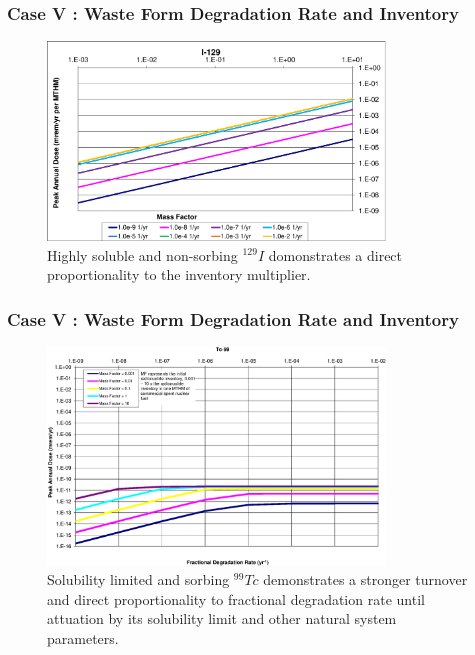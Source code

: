 \begin{frame}[c]
  \frametitle{Case V : Waste Form Degradation Rate and Inventory}

\begin{figure}[ht!]
\centering
\includegraphics[width=0.8\textwidth]{WFDegAndInv/I-129-MF.eps}
\caption{
Highly soluble and non-sorbing $^{129}I$ domonstrates a direct 
proportionality to the inventory multiplier.}
\label{fig:WFDegI129MF}
\end{figure}
\end{frame}

\begin{frame}[c]
  \frametitle{Case V : Waste Form Degradation Rate and Inventory}
\begin{figure}[ht!]
\centering
\includegraphics[width=0.8\textwidth]{WFDegAndInv/Tc-99.eps}
\caption{
Solubility limited and sorbing $^{99}Tc$ demonstrates a stronger turnover and direct proportionality 
to fractional degradation rate until attuation by its solubility limit and other 
natural system parameters. } 
\label{fig:WFDegTc99}
\end{figure}
\end{frame}

